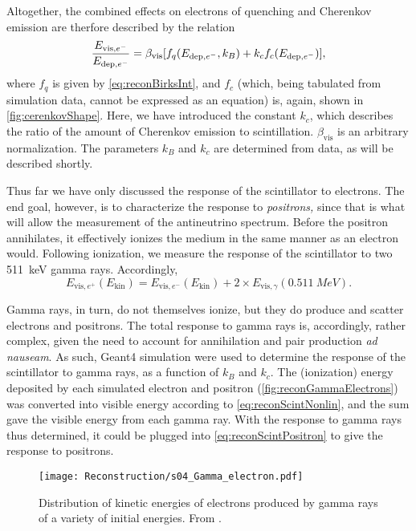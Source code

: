 \documentclass[../thesis.tex]{subfiles}
\begin{document}
Altogether, the combined effects on electrons of quenching and Cherenkov emission are therfore described by the relation
\begin{equation}
  \label{eq:reconScintNonlin}
  \frac{E_{\mathrm{vis},e^-}}{E_{\mathrm{dep},e^-}} = \beta_{\mathrm{vis}}[f_q(E_{\mathrm{dep},e^-}, k_B) + k_c f_c(E_{\mathrm{dep},e^-})],
\end{equation}
where $f_q$ is given by \autoref{eq:reconBirksInt}, and $f_c$ (which, being tabulated from simulation data, cannot be expressed as an equation) is, again, shown in \autoref{fig:cerenkovShape}. Here, we have introduced the constant $k_c$, which describes the ratio of the amount of Cherenkov emission to scintillation. $\beta_{\mathrm{vis}}$ is an arbitrary normalization. The parameters $k_B$ and $k_c$ are determined from data, as will be described shortly.

Thus far we have only discussed the response of the scintillator to electrons. The end goal, however, is to characterize the response to \emph{positrons,} since that is what will allow the measurement of the antineutrino spectrum. Before the positron annihilates, it effectively ionizes the medium in the same manner as an electron would. Following ionization, we measure the response of the scintillator to two 511~keV gamma rays. Accordingly,
\begin{equation}
  \label{eq:reconScintPositron}
  E_{\mathrm{vis},e^+}(E_{\mathrm{kin}}) = E_{\mathrm{vis},e^-}(E_{\mathrm{kin}}) + 2 \times E_{\mathrm{vis},\gamma}(\SI{0.511}{MeV}).
\end{equation}

Gamma rays, in turn, do not themselves ionize, but they do produce and scatter electrons and positrons. The total response to gamma rays is, accordingly, rather complex, given the need to account for annihilation and pair production \emph{ad nauseam}. As such, Geant4 simulation were used to determine the response of the scintillator to gamma rays, as a function of $k_B$ and $k_c$. The (ionization) energy deposited by each simulated electron and positron (\autoref{fig:reconGammaElectrons}) was converted into visible energy according to \autoref{eq:reconScintNonlin}, and the sum gave the visible energy from each gamma ray. With the response to gamma rays thus determined, it could be plugged into \autoref{eq:reconScintPositron} to give the response to positrons.

\begin{figure}[h]
  \texttt{[image: Reconstruction/s04\_Gamma\_electron.pdf]}
  \caption{Distribution of kinetic energies of electrons produced by gamma rays of a variety of initial energies. From \cite{NonlinearityPaper}.}
  \label{fig:reconGammaElectrons}
\end{figure}
\end{document}
